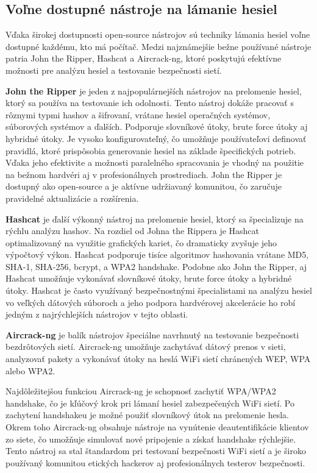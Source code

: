 \documentclass[12pt, twoside]{book}
\begin{document}
\subsection{Voľne dostupné nástroje na lámanie hesiel}
Vďaka širokej dostupnosti open-source nástrojov sú techniky lámania hesiel voľne dostupné každému, kto má počítač. Medzi najznámejšie bežne používané nástroje patria John the Ripper, Hashcat a Aircrack-ng, ktoré poskytujú efektívne možnosti pre analýzu hesiel a testovanie bezpečnosti sietí.

\textbf{John the Ripper} je jeden z najpopulárnejších nástrojov na prelomenie hesiel, ktorý sa používa na testovanie ich odolnosti. Tento nástroj dokáže pracovať s rôznymi typmi hashov a šifrovaní, vrátane hesiel operačných systémov, súborových systémov a ďalších. Podporuje slovníkové útoky, brute force útoky aj hybridné útoky. Je vysoko konfigurovateľný, čo umožňuje používateľovi definovať pravidlá, ktoré prispôsobia generovanie hesiel na základe špecifických potrieb. Vďaka jeho efektivite a možnosti paralelného spracovania je vhodný na použitie na bežnom hardvéri aj v profesionálnych prostrediach. John the Ripper je dostupný ako open-source a je aktívne udržiavaný komunitou, čo zaručuje pravidelné aktualizácie a rozšírenia.


\textbf{Hashcat} je ďalší výkonný nástroj na prelomenie hesiel, ktorý sa špecializuje na rýchlu analýzu hashov. Na rozdiel od Johna the Rippera je Hashcat optimalizovaný na využitie grafických kariet, čo dramaticky zvyšuje jeho výpočtový výkon. Hashcat podporuje tisíce algoritmov hashovania vrátane MD5, SHA-1, SHA-256, bcrypt, a WPA2 handshake. Podobne ako John the Ripper, aj Hashcat umožňuje vykonávať slovníkové útoky, brute force útoky a hybridné útoky. Hashcat je často využívaný bezpečnostnými špecialistami na analýzu hesiel vo veľkých dátových súboroch a jeho podpora hardvérovej akcelerácie ho robí jedným z najrýchlejších nástrojov v tejto oblasti.


\textbf{Aircrack-ng} je balík nástrojov špeciálne navrhnutý na testovanie bezpečnosti bezdrôtových sietí. Aircrack-ng umožňuje zachytávať dátový prenos v sieti, analyzovať pakety a vykonávať útoky na heslá WiFi sietí chránených WEP, WPA alebo WPA2. 

Najdôležitejšou funkciou Aircrack-ng je schopnosť zachytiť WPA/WPA2 handshake, čo je kľúčový krok pri lámaní hesiel zabezpečených WiFi sietí. Po zachytení handshakeu je možné použiť slovníkový útok na prelomenie hesla. Okrem toho Aircrack-ng obsahuje nástroje na vynútenie deautentifikácie klientov zo siete, čo umožňuje simulovať nové pripojenie a získať handshake rýchlejšie. Tento nástroj sa stal štandardom pri testovaní bezpečnosti WiFi sietí a je široko používaný komunitou etických hackerov aj profesionálnych testerov bezpečnosti.
\end{document}

